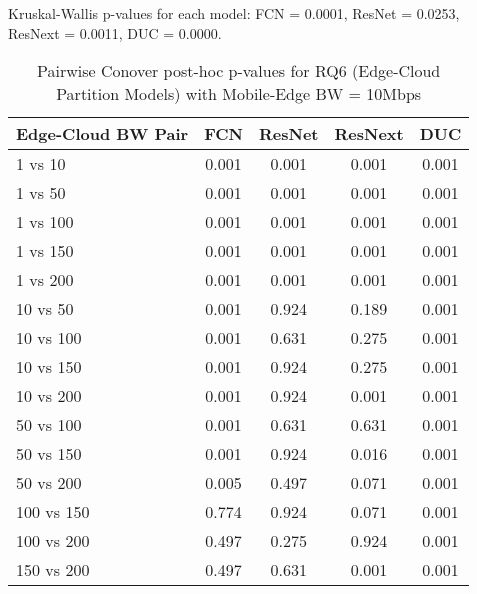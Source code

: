 \begin{table}[h]
\centering
\caption{Pairwise Conover post-hoc p-values for RQ6 (Edge-Cloud Partition Models) with Mobile-Edge BW = 10Mbps}
\label{tab:conover_edge_cloud_partition_me10}
\smallskip
Kruskal-Wallis p-values for each model: FCN = 0.0001, ResNet = 0.0253, ResNext = 0.0011, DUC = 0.0000.

\begin{tabular}{lcccc}
\toprule
Edge-Cloud BW Pair & FCN & ResNet & ResNext & DUC \\
\midrule
1 vs 10 & 0.001 & 0.001 & 0.001 & 0.001 \\
1 vs 50 & 0.001 & 0.001 & 0.001 & 0.001 \\
1 vs 100 & 0.001 & 0.001 & 0.001 & 0.001 \\
1 vs 150 & 0.001 & 0.001 & 0.001 & 0.001 \\
1 vs 200 & 0.001 & 0.001 & 0.001 & 0.001 \\
10 vs 50 & 0.001 & 0.924 & 0.189 & 0.001 \\
10 vs 100 & 0.001 & 0.631 & 0.275 & 0.001 \\
10 vs 150 & 0.001 & 0.924 & 0.275 & 0.001 \\
10 vs 200 & 0.001 & 0.924 & 0.001 & 0.001 \\
50 vs 100 & 0.001 & 0.631 & 0.631 & 0.001 \\
50 vs 150 & 0.001 & 0.924 & 0.016 & 0.001 \\
50 vs 200 & 0.005 & 0.497 & 0.071 & 0.001 \\
100 vs 150 & 0.774 & 0.924 & 0.071 & 0.001 \\
100 vs 200 & 0.497 & 0.275 & 0.924 & 0.001 \\
150 vs 200 & 0.497 & 0.631 & 0.001 & 0.001 \\
\bottomrule
\end{tabular}
\end{table}

